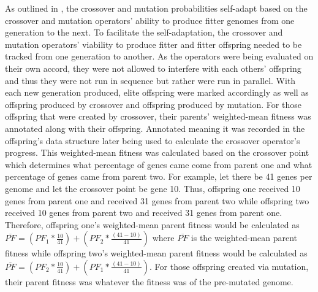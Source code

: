 \documentclass[a4paper,10pt]{article}
\begin{document}
As outlined in \cite{self_adapt}, the crossover and mutation probabilities self-adapt based on the crossover and mutation operators' ability to produce fitter genomes from one generation to the next. To facilitate the self-adaptation, the crossover and mutation operators' viability to produce fitter and fitter offspring needed to be tracked from one generation to another. As the operators were being evaluated on their own accord, they were not allowed to interfere with each others' offspring and thus they were not run in sequence but rather were run in parallel. With each new generation produced, elite offspring were marked accordingly as well as offspring produced by crossover and offspring produced by mutation. For those offspring that were created by crossover, their parents' weighted-mean fitness was annotated along with their offspring. Annotated meaning it was recorded in the offspring's data structure later being used to calculate the crossover operator's progress. This weighted-mean fitness was calculated based on the crossover point which determines what percentage of genes came come from parent one and what percentage of genes came from parent two. For example, let there be 41 genes per genome and let the crossover point be gene 10. Thus, offspring one received 10 genes from parent one and received 31 genes from parent two while offspring two received 10 genes from parent two and received 31 genes from parent one. Therefore, offspring one's weighted-mean parent fitness would be calculated as $\overline{PF} = \left ( PF_1 * \frac{10}{41} \right ) + \left (PF_2 * \frac{(41-10)}{41} \right)$ where $\overline{PF}$ is the weighted-mean parent fitness while offspring two's weighted-mean parent fitness would be calculated as $\overline{PF} = \left ( PF_2 * \frac{10}{41} \right ) + \left (PF_1 * \frac{(41-10)}{41} \right)$. For those offspring created via mutation, their parent fitness was whatever the fitness was of the pre-mutated genome. 
\end{document}
